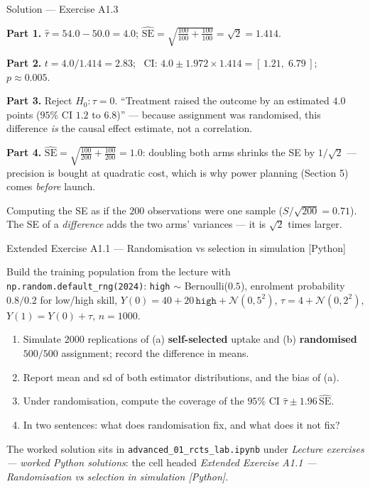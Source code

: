 \documentclass[aspectratio=169,11pt]{beamer}
\begin{document}
\begin{frame}{Solution --- Exercise A1.3}
\begin{solutionbox}
  \textbf{Part 1.} $\hat\tau = 54.0 - 50.0 = 4.0$;
  $\widehat{\mathrm{SE}} = \sqrt{\tfrac{100}{100} + \tfrac{100}{100}} = \sqrt2 = 1.414$.

  \smallskip
  \textbf{Part 2.} $t = 4.0/1.414 = 2.83$; \ CI:
  $4.0 \pm 1.972 \times 1.414 = [\,1.21,\; 6.79\,]$; \ $p \approx 0.005$.

  \smallskip
  \textbf{Part 3.} Reject $H_0\!: \tau = 0$. ``Treatment raised the outcome by an
  estimated $4.0$ points ($95\%$ CI $1.2$ to $6.8$)'' --- because assignment was
  randomised, this difference \emph{is} the causal effect estimate, not a correlation.

  \smallskip
  \textbf{Part 4.} $\widehat{\mathrm{SE}} = \sqrt{\tfrac{100}{200}+\tfrac{100}{200}} = 1.0$:
  doubling both arms shrinks the SE by $1/\sqrt2$ --- precision is bought at quadratic
  cost, which is why power planning (Section 5) comes \emph{before} launch.
\end{solutionbox}
\begin{mistake}
  Computing the SE as if the $200$ observations were one sample
  ($S/\sqrt{200} = 0.71$). The SE of a \emph{difference} adds the two arms' variances ---
  it is $\sqrt2$ times larger.
\end{mistake}
\end{frame}

\begin{frame}{Extended Exercise A1.1 --- Randomisation vs selection in simulation [Python]}
\begin{longexercise}
  Build the training population from the lecture with \texttt{np.random.default\_rng(2024)}:
  \texttt{high} $\sim$ Bernoulli($0.5$), enrolment probability $0.8/0.2$ for low/high skill,
  $Y(0) = 40 + 20\,\texttt{high} + \mathcal N(0,5^2)$,
  $\tau = 4 + \mathcal N(0,2^2)$, $Y(1)=Y(0)+\tau$, $n=1000$.
  \begin{enumerate}
    \item Simulate $2000$ replications of (a) \textbf{self-selected} uptake and
          (b) \textbf{randomised} $500/500$ assignment; record the difference in means.
    \item Report mean and sd of both estimator distributions, and the bias of (a).
    \item Under randomisation, compute the coverage of the $95\%$ CI
          $\hat\tau \pm 1.96\,\widehat{\mathrm{SE}}$.
    \item In two sentences: what does randomisation fix, and what does it not fix?
  \end{enumerate}
\end{longexercise}
\begin{labnote}
  The worked solution sits in \texttt{advanced\_01\_rcts\_lab.ipynb} under
  \emph{Lecture exercises --- worked Python solutions}: the cell headed
  \emph{Extended Exercise A1.1 --- Randomisation vs selection in simulation [Python]}.
\end{labnote}
\end{frame}
\end{document}
